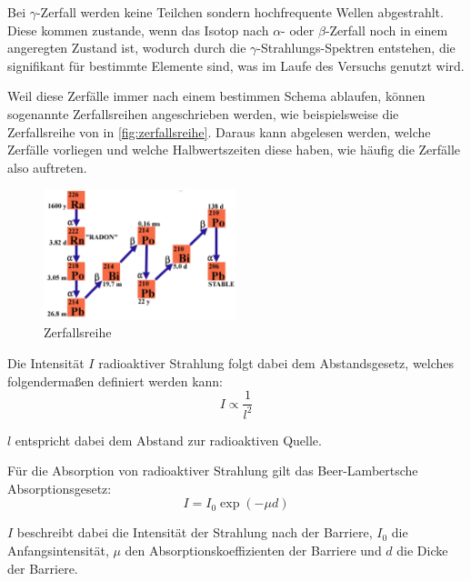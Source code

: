 \documentclass[12pt,english,ngerman]{scrartcl}
\begin{document}
Bei \(\gamma\)-Zerfall werden keine Teilchen sondern hochfrequente Wellen
abgestrahlt. Diese kommen zustande, wenn das Isotop nach \(\alpha\)- oder
\(\beta\)-Zerfall noch in einem angeregten Zustand ist, wodurch durch die
\(\gamma\)-Strahlungs-Spektren entstehen, die signifikant für bestimmte
Elemente sind, was im Laufe des Versuchs genutzt wird.

Weil diese Zerfälle immer nach einem bestimmen Schema ablaufen, können
sogenannte Zerfallsreihen angeschrieben werden, wie beispielsweise die
Zerfallsreihe von  in \autoref{fig:zerfallsreihe}. Daraus
kann abgelesen werden, welche Zerfälle vorliegen und welche Halbwertszeiten
diese haben, wie häufig die Zerfälle also auftreten.

\begin{figure}[H]
	\begin{center}
		\includegraphics[width = 0.5\textwidth]{./figures/zerfallsreihe.png}
	\end{center}
	\caption{
		Zerfallsreihe ~\cite{zerfallsreihera226}
	}\label{fig:zerfallsreihe}
\end{figure}

Die Intensität \(I\) radioaktiver Strahlung folgt dabei dem Abstandsgesetz,
welches folgendermaßen definiert werden kann:
\begin{equation}
	I \propto \frac{1}{l^2}
	\label{eq:abstandsgesetz}
\end{equation}

\(l\) entspricht dabei dem Abstand zur radioaktiven Quelle.

Für die Absorption von radioaktiver Strahlung gilt das Beer-Lambertsche
Absorptionsgesetz:
\begin{equation}
	I = I_0 \exp(-\mu d)
	\label{eq:beerschesgesetzt}
\end{equation}

\(I\) beschreibt dabei die Intensität der Strahlung nach der Barriere, \(I_0\)
die Anfangsintensität, \(\mu\) den Absorptionskoeffizienten der Barriere und
\(d\) die Dicke der Barriere.
\end{document}
